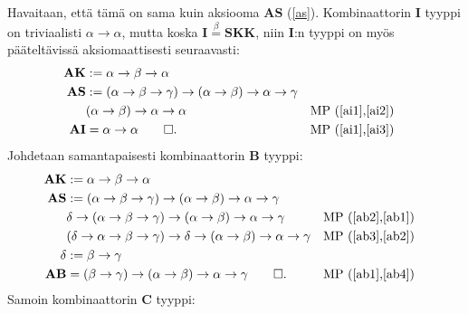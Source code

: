 \documentclass[a4paper,12pt]{amsart}
\begin{document}
Havaitaan, että tämä on sama kuin aksiooma $\mathbf{AS}$ (\ref{as}). Kombinaattorin $\mathbf{I}$ tyyppi on triviaalisti $\alpha\to\alpha$, mutta koska $\mathbf{I}\stackrel{\beta}{=}\mathbf{SKK}$, niin $\mathbf{I}$:n tyyppi on myös pääteltävissä aksiomaattisesti seuraavasti:
\begin{align}
\mathbf{AK} &:= \alpha\to\beta\to\alpha \label{ai1} \\
\mathbf{AS} &:= (\alpha\to\beta\to\gamma)\to(\alpha\to\beta)\to\alpha\to\gamma \label{ai2} \\
& (\alpha\to\beta)\to\alpha\to\alpha && \text{MP (\ref{ai1},\ref{ai2})} \label{ai3} \\
\mathbf{AI} &= \alpha\to\alpha\qed. && \text{MP (\ref{ai1},\ref{ai3})}
\end{align}
Johdetaan samantapaisesti kombinaattorin $\mathbf{B}$ tyyppi:
\begin{align}
\mathbf{AK} &:= \alpha\to\beta\to\alpha \label{ab1} \\
\mathbf{AS} &:= (\alpha\to\beta\to\gamma)\to(\alpha\to\beta)\to\alpha\to\gamma \label{ab2} \\
& \delta\to(\alpha\to\beta\to\gamma)\to(\alpha\to\beta)\to\alpha\to\gamma && \text{MP (\ref{ab2},\ref{ab1})} \label{ab3} \\
& (\delta\to\alpha\to\beta\to\gamma)\to\delta\to(\alpha\to\beta)\to\alpha\to\gamma && \text{MP (\ref{ab3},\ref{ab2})} \label{ab4} \\
\delta &:= \beta\to\gamma \\
\mathbf{AB} &= (\beta\to\gamma)\to(\alpha\to\beta)\to\alpha\to\gamma\qed. && \text{MP (\ref{ab1},\ref{ab4})}
\end{align}
Samoin kombinaattorin $\mathbf{C}$ tyyppi:
\end{document}

